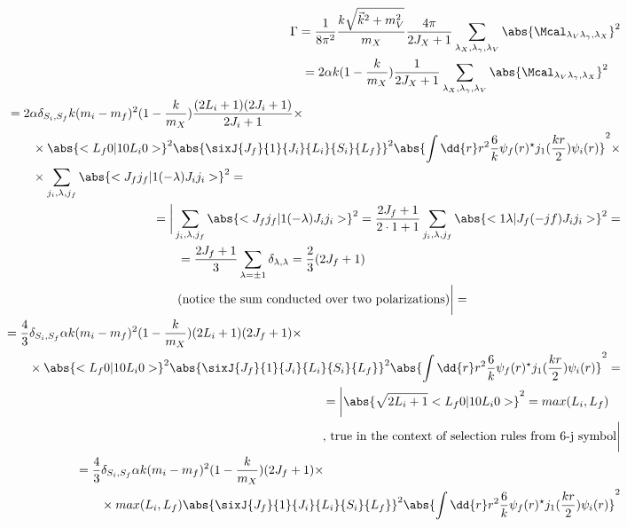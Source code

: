 \begin{align}
    \begin{split}
        \Gamma = \frac{1}{8 \pi^2} \frac{k \sqrt{\vec{k}^2 + m_V^2}}{m_X} \frac{4\pi}{2J_X + 1} \sum_{\lambda_X, \lambda_\gamma, \lambda_V} \abs{\Mcal_{\lambda_V \lambda_\gamma, \lambda_X}}^2
    \end{split}\\
    \begin{split}
        &= 2 \alpha k (1 - \frac{k}{m_X}) \frac{1}{2J_X + 1} \sum_{\lambda_X, \lambda_\gamma, \lambda_V} \abs{\Mcal_{\lambda_V \lambda_\gamma, \lambda_X}}^2
    \end{split}\\
    \begin{split}
        &= 2 \alpha \delta_{S_i, S_f} k (m_i - m_f)^2 (1 - \frac{k}{m_X}) \frac{(2L_i + 1) (2J_i + 1)}{2J_i + 1} \times \\
        &\qquad\times \abs{<L_f 0 |  1 0 L_i 0>}^2 \abs{\sixJ{J_f}{1}{J_i}{L_i}{S_i}{L_f}}^2 \abs{\int \dd{r} r^2 \frac{6}{k} \psi_f(r)^\star j_1(\frac{kr}{2}) \psi_i(r) }^2 \times \\
        &\qquad\times \sum_{j_i, \lambda, j_f} \abs{<J_f j_f | 1 (-\lambda) J_i j_i>}^2 =
    \end{split}\\
    \begin{split}
        &=\bigg\lvert \sum_{j_i, \lambda, j_f} \abs{<J_f j_f | 1 (-\lambda) J_i j_i>}^2 = \frac{2J_f+1}{2\cdot1 + 1} \sum_{j_i, \lambda, j_f} \abs{<1 \lambda | J_f (-jf) J_i j_i>}^2 = \\
        &\qquad= \frac{2J_f+1}{3} \sum_{\lambda = \pm1} \delta_{\lambda, \lambda} = \frac{2}{3} (2J_f+1) \\
        &\qquad \text{(notice the sum conducted over two polarizations)} \bigg\rvert=
    \end{split}\\
    \begin{split}
        &= \frac{4}{3} \delta_{S_i, S_f} \alpha k (m_i - m_f)^2 (1 - \frac{k}{m_X}) (2L_i + 1) (2J_f + 1) \times \\
        &\qquad\times \abs{<L_f 0 |  1 0 L_i 0>}^2 \abs{\sixJ{J_f}{1}{J_i}{L_i}{S_i}{L_f}}^2 \abs{\int \dd{r} r^2 \frac{6}{k} \psi_f(r)^\star j_1(\frac{kr}{2}) \psi_i(r) }^2 =
    \end{split}\\
    \begin{split}
        &= \bigg\lvert \abs{\sqrt{2L_i+1} <L_f 0 | 1 0 L_i 0>}^2 = max(L_i, L_f) \\
        &\text{, true in the context of selection rules from 6-j symbol} \bigg\rvert
    \end{split}\\
    \begin{split}
        &= \frac{4}{3} \delta_{S_i, S_f} \alpha k (m_i - m_f)^2 (1 - \frac{k}{m_X}) (2J_f + 1) \times \\
        &\qquad\times max(L_i, L_f) \abs{\sixJ{J_f}{1}{J_i}{L_i}{S_i}{L_f}}^2 \abs{\int \dd{r} r^2 \frac{6}{k} \psi_f(r)^\star j_1(\frac{kr}{2}) \psi_i(r) }^2
    \end{split}
\end{align}

